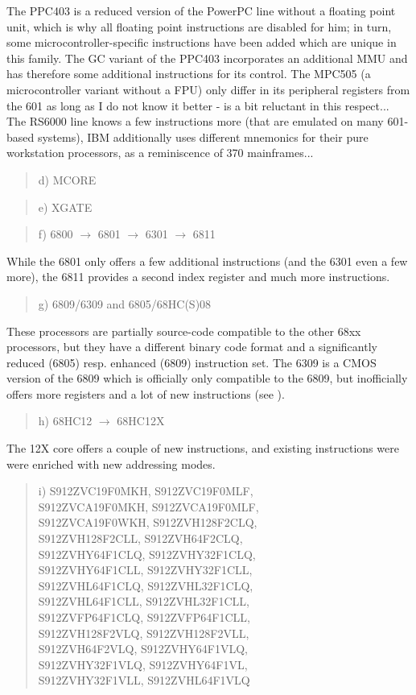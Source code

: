 \documentclass[12pt,twoside]{report}
\begin{document}
The PPC403 is a reduced version of the PowerPC line without a floating
point unit, which is why all floating point instructions are disabled for
him; in turn, some microcontroller-specific instructions have been added
which are unique in this family.  The GC variant of the PPC403
incorporates an additional MMU and has therefore some additional
instructions for its control.  The MPC505 (a microcontroller variant
without a FPU) only differ in its peripheral registers from the 601 as
long as I do not know it better - \cite{Mot505} is a bit reluctant in this
respect...  The RS6000 line knows a few instructions more (that are
emulated on many 601-based systems), IBM additionally uses different
mnemonics for their pure workstation processors, as a reminiscence of 370
mainframes...
\begin{quote}
d) MCORE
\end{quote}
\begin{quote}
e) XGATE
\end{quote}
\begin{quote}
f) 6800 $\rightarrow$ 6801 $\rightarrow$ 6301 $\rightarrow$ 6811
\end{quote}
While the 6801 only offers a few additional instructions (and the
6301 even a few more), the 6811 provides a second index register and
much more instructions.
\begin{quote}
g) 6809/6309 and 6805/68HC(S)08
\end{quote}
These processors are partially source-code compatible to the other
68xx processors, but they have a different binary code format and a
significantly reduced (6805) resp. enhanced (6809) instruction set.
The 6309 is a CMOS version of the 6809 which is officially only
compatible to the 6809, but inofficially offers more registers and a
lot of new instructions (see \cite{Kaku}).
\begin{quote}
h) 68HC12 $\longrightarrow$ 68HC12X
\end{quote}
The 12X core offers a couple of new instructions, and existing
instructions were were enriched with new addressing modes.
\begin{quote}
i) S912ZVC19F0MKH, S912ZVC19F0MLF,\\
   S912ZVCA19F0MKH, S912ZVCA19F0MLF,\\
   S912ZVCA19F0WKH, S912ZVH128F2CLQ,\\
   S912ZVH128F2CLL, S912ZVH64F2CLQ,\\
   S912ZVHY64F1CLQ, S912ZVHY32F1CLQ,\\
   S912ZVHY64F1CLL, S912ZVHY32F1CLL,\\
   S912ZVHL64F1CLQ, S912ZVHL32F1CLQ,\\
   S912ZVHL64F1CLL, S912ZVHL32F1CLL,\\
   S912ZVFP64F1CLQ, S912ZVFP64F1CLL,\\
   S912ZVH128F2VLQ, S912ZVH128F2VLL,\\
   S912ZVH64F2VLQ, S912ZVHY64F1VLQ,\\
   S912ZVHY32F1VLQ, S912ZVHY64F1VL,\\
   S912ZVHY32F1VLL, S912ZVHL64F1VLQ 
\end{quote}
\end{document}

